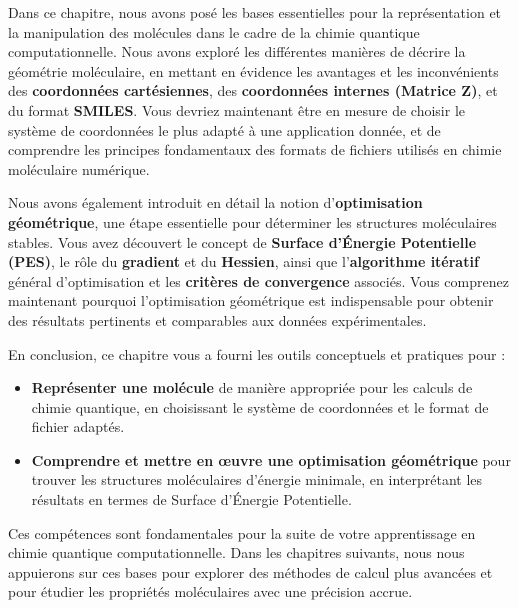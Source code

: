 \documentclass[12pt,a4paper]{article} %
\numberwithin{equation}{section} %
\numberwithin{figure}{section} %
\numberwithin{table}{section} %
\begin{document}
Dans ce chapitre, nous avons posé les bases essentielles pour la représentation et la manipulation des molécules dans le cadre de la chimie quantique computationnelle. Nous avons exploré les différentes manières de décrire la géométrie moléculaire, en mettant en évidence les avantages et les inconvénients des \textbf{coordonnées cartésiennes}, des \textbf{coordonnées internes (Matrice Z)}, et du format \textbf{SMILES}. Vous devriez maintenant être en mesure de choisir le système de coordonnées le plus adapté à une application donnée, et de comprendre les principes fondamentaux des formats de fichiers utilisés en chimie moléculaire numérique.

Nous avons également introduit en détail la notion d'\textbf{optimisation géométrique}, une étape essentielle pour déterminer les structures moléculaires stables. Vous avez découvert le concept de \textbf{Surface d'Énergie Potentielle (PES)}, le rôle du \textbf{gradient} et du \textbf{Hessien}, ainsi que l'\textbf{algorithme itératif} général d'optimisation et les \textbf{critères de convergence} associés. Vous comprenez maintenant pourquoi l'optimisation géométrique est indispensable pour obtenir des résultats pertinents et comparables aux données expérimentales.

En conclusion, ce chapitre vous a fourni les outils conceptuels et pratiques pour :
\begin{itemize}
 \item \textbf{Représenter une molécule} de manière appropriée pour les calculs de chimie quantique, en choisissant le système de coordonnées et le format de fichier adaptés.
 
 \item \textbf{Comprendre et mettre en œuvre une optimisation géométrique} pour trouver les structures moléculaires d'énergie minimale, en interprétant les résultats en termes de Surface d'Énergie Potentielle.
\end{itemize}

Ces compétences sont fondamentales pour la suite de votre apprentissage en chimie quantique computationnelle. Dans les chapitres suivants, nous nous appuierons sur ces bases pour explorer des méthodes de calcul plus avancées et pour étudier les propriétés moléculaires avec une précision accrue.
\end{document}
